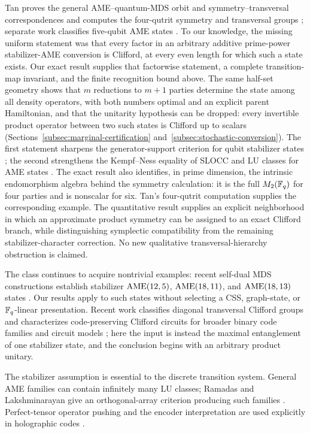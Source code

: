 Tan proves the general AME--quantum-MDS orbit and
symmetry--transversal correspondences \cite[Theorems~3.5 and~3.6]{Tan2026}
and computes the four-qutrit symmetry and transversal groups
\cite[Theorem~5.3]{Tan2026}; separate work classifies five-qubit AME states
\cite{TanFiveQubit2026}.  To our knowledge, the missing
uniform statement was that every factor in an arbitrary additive
prime-power stabilizer-AME conversion is Clifford, at every even length for
which such a state exists.  Our exact result supplies that factorwise
statement, a complete transition-map invariant, and the finite recognition
bound above.  The same half-set geometry shows that \(m\) reductions to
\(m+1\) parties determine the state among all density operators, with both
numbers optimal and an explicit parent Hamiltonian, and that the unitarity
hypothesis can be dropped: every invertible product operator between two
such states is Clifford up to scalars
(Sections~\ref{subsec:marginal-certification} and~\ref{subsec:stochastic-conversion}).  The first statement
sharpens the generator-support criterion for qubit stabilizer states
\cite[Theorem~2]{WuYangWangWenQin2015}; the second strengthens the
Kempf--Ness equality of SLOCC and LU classes for AME states
\cite[Corollary~1]{BurchardtRaissi2020}.
The exact result also identifies, in prime dimension, the intrinsic
endomorphism algebra behind the symmetry calculation: it is the full
\(M_2(\mathbb F_q)\) for four parties and is nonscalar for six.  Tan's four-qutrit
computation supplies the corresponding example.  The
quantitative result supplies an explicit neighborhood in which an
approximate product symmetry can be assigned to an exact Clifford branch,
while distinguishing symplectic compatibility from the remaining
stabilizer-character correction.  No new qualitative
transversal-hierarchy obstruction is claimed.

The class continues to acquire nontrivial examples: recent self-dual MDS
constructions establish stabilizer \(\mathrm{AME}(12,5)\), \(\mathrm{AME}(18,11)\), and
\(\mathrm{AME}(18,13)\) states \cite{BevinsBidav2026}.  Our results apply to such
states without selecting a CSS, graph-state, or \(\mathbb F_q\)-linear
presentation.  Recent work classifies diagonal transversal Clifford groups
and characterizes code-preserving Clifford circuits for broader binary code
families and circuit models \cite{DasuBurton2025,Albert2026}; here the input
is instead the maximal entanglement of one stabilizer state, and the
conclusion begins with an arbitrary product unitary.

The stabilizer assumption is essential to the discrete transition system.
General AME families can contain infinitely many LU classes; Ramadas and
Lakshminarayan give an orthogonal-array criterion producing such families
\cite[Theorem~1 and Corollary~1]{RamadasLakshminarayan2025}.  Perfect-tensor
operator pushing and the encoder interpretation are used explicitly in
holographic codes \cite[Eq.~(2.3) and Section~5.7]{PastawskiYoshidaHarlowPreskill2015}.

